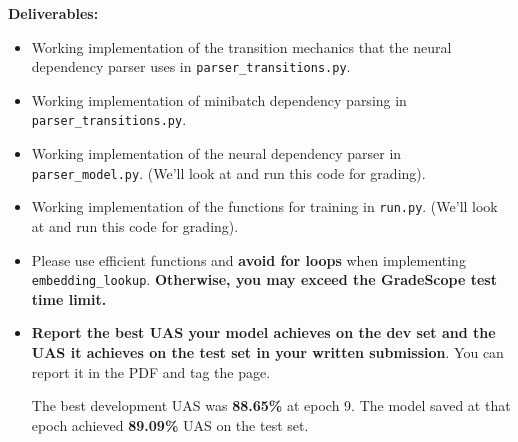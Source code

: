 \begin{parts}
\begin{enumerate}[label=\roman*.]
    \textbf{Deliverables:}\par\nopagebreak[4]
        \begin{itemize}
            \item Working implementation of the transition mechanics that the neural dependency parser uses in \texttt{parser\_transitions.py}. 
            \item Working implementation of minibatch dependency parsing in \texttt{parser\_transitions.py}.
            \item Working implementation of the neural dependency parser in \texttt{parser\_model.py}. (We'll look at and run this code for grading).
            \item Working implementation of the functions for training in \texttt{run.py}. (We'll look at and run this code for grading).
            \item Please use efficient functions and \textbf{avoid for loops} when implementing \texttt{embedding\_lookup}. \textbf{Otherwise, you may exceed the GradeScope test time limit.}
            \item \textbf{Report the best UAS your model achieves on the dev set and the UAS it achieves on the test set in your written submission}. You can report it in the PDF and tag the page.
            \par\begin{answer}
            The best development UAS was \textbf{88.65\%} at epoch 9.
            The model saved at that epoch achieved \textbf{89.09\%} UAS on the test set.
            \end{answer}

    \end{itemize}
    \end{enumerate}
    
\end{parts}
